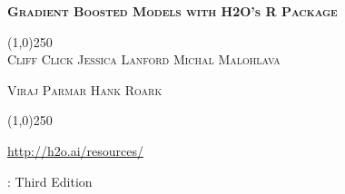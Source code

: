 








\thispagestyle{empty} %


\begin{center}
\textsc{\Large\bf{Gradient Boosted Models with H2O's R Package}}

\bigskip
\line(1,0){250}  %
\\
\bigskip
\small
\textsc{Cliff Click \hspace{10pt} Jessica Lanford \hspace{10pt} Michal Malohlava}

\textsc{Viraj Parmar \hspace{10pt} Hank Roark}

\normalsize

\line(1,0){250}  %

{\url{http://h2o.ai/resources/}}

\bigskip

\monthname \hspace{1pt}  \the\year: Third Edition 

\bigskip
\end{center}


\newpage
\restoregeometry

\null\vfill %

\thispagestyle{empty}%

